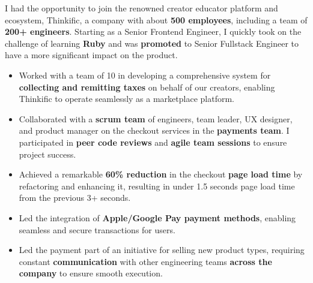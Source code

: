 \bigskip
{}
I had the opportunity to join the renowned creator educator platform and ecosystem, Thinkific, a company with about \textbf{500 employees}, including a team of \textbf{200+ engineers}. Starting as a Senior Frontend Engineer, I quickly took on the challenge of learning \textbf{Ruby} and was \textbf{promoted} to Senior Fullstack Engineer to have a more significant impact on the product.
\medskip
\begin{itemize}
    \item Worked with a team of 10 in developing a comprehensive system for \textbf{collecting and remitting taxes} on behalf of our creators, enabling Thinkific to operate seamlessly as a marketplace platform.
    \item Collaborated with a \textbf{scrum team} of engineers, team leader, UX designer, and product manager on the checkout services in the \textbf{payments team}. I participated in \textbf{peer code reviews} and \textbf{agile team sessions} to ensure project success.
    \item Achieved a remarkable \textbf{60\% reduction} in the checkout \textbf{page load time} by refactoring and enhancing it, resulting in under 1.5 seconds page load time from the previous 3+ seconds.
    \item Led the integration of \textbf{Apple/Google Pay payment methods}, enabling seamless and secure transactions for users.
    \item Led the payment part of an initiative for selling new product types, requiring constant \textbf{communication} with other engineering teams \textbf{across the company} to ensure smooth execution.
\end{itemize}
